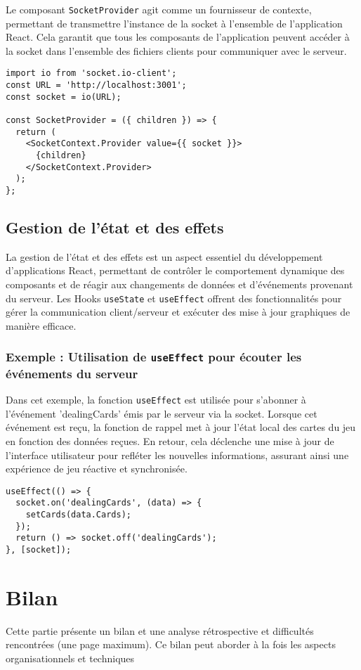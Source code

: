 \documentclass[a4paper]{article}
\begin{document}
Le composant \texttt{SocketProvider} agit comme un fournisseur de contexte, permettant de transmettre l'instance de la socket à l'ensemble de l'application React. Cela garantit que tous les composants de l'application peuvent accéder à la socket dans l'ensemble des fichiers clients pour communiquer avec le serveur.

\begin{verbatim}
import io from 'socket.io-client';
const URL = 'http://localhost:3001';
const socket = io(URL);

const SocketProvider = ({ children }) => {
  return (
    <SocketContext.Provider value={{ socket }}>
      {children}
    </SocketContext.Provider>
  );
};
\end{verbatim}

\subsection{Gestion de l'état et des effets}

La gestion de l'état et des effets est un aspect essentiel du développement d'applications React, permettant de contrôler le comportement dynamique des composants et de réagir aux changements de données et d'événements provenant du serveur. Les Hooks \texttt{useState} et \texttt{useEffect} offrent des fonctionnalités pour gérer la communication client/serveur et exécuter des mise à jour graphiques de manière efficace.

\subsubsection{Exemple : Utilisation de \texttt{useEffect} pour écouter les événements du serveur}

Dans cet exemple, la fonction \texttt{useEffect} est utilisée pour s'abonner à l'événement 'dealingCards' émis par le serveur via la socket. Lorsque cet événement est reçu, la fonction de rappel met à jour l'état local des cartes du jeu en fonction des données reçues. En retour, cela déclenche une mise à jour de l'interface utilisateur pour refléter les nouvelles informations, assurant ainsi une expérience de jeu réactive et synchronisée.

\begin{verbatim}
useEffect(() => {
  socket.on('dealingCards', (data) => {
    setCards(data.Cards);
  });
  return () => socket.off('dealingCards');
}, [socket]);
\end{verbatim}

\section{Bilan}

Cette partie présente un bilan et une analyse rétrospective et difficultés rencontrées 
(une page maximum). Ce bilan peut aborder à la fois les aspects organisationnels et 
techniques

    
\end{document}
